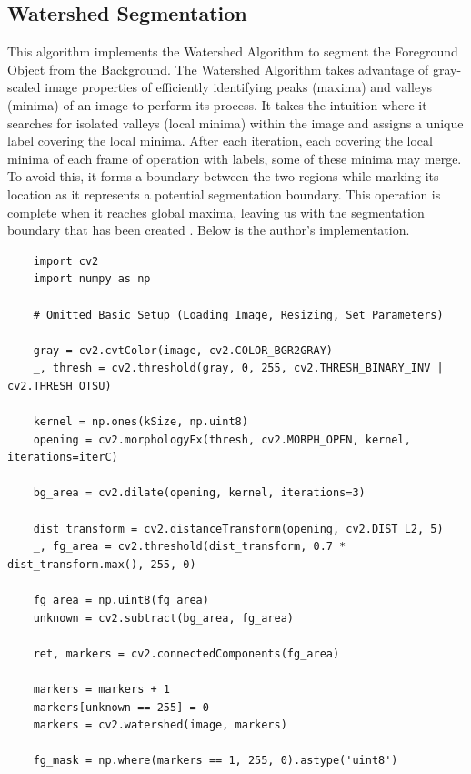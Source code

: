\documentclass{article}
\begin{document}
\subsection{Watershed Segmentation}

This algorithm implements the Watershed Algorithm to segment the Foreground Object from the Background. The Watershed Algorithm takes advantage of gray-scaled image properties of efficiently identifying peaks (maxima) and valleys (minima) of an image to perform its process. It takes the intuition where it searches for isolated valleys (local minima) within the image and assigns a unique label covering the local minima. After each iteration, each covering the local minima of each frame of operation with labels, some of these minima may merge. To avoid this, it forms a boundary between the two regions while marking its location as it represents a potential segmentation boundary. This operation is complete when it reaches global maxima, leaving us with the segmentation boundary that has been created \cite{Watershed2000}. Below is the author's implementation.

\begin{verbatim}
    import cv2
    import numpy as np

    # Omitted Basic Setup (Loading Image, Resizing, Set Parameters)

    gray = cv2.cvtColor(image, cv2.COLOR_BGR2GRAY)
    _, thresh = cv2.threshold(gray, 0, 255, cv2.THRESH_BINARY_INV | cv2.THRESH_OTSU)

    kernel = np.ones(kSize, np.uint8)
    opening = cv2.morphologyEx(thresh, cv2.MORPH_OPEN, kernel, iterations=iterC)

    bg_area = cv2.dilate(opening, kernel, iterations=3)

    dist_transform = cv2.distanceTransform(opening, cv2.DIST_L2, 5)
    _, fg_area = cv2.threshold(dist_transform, 0.7 * dist_transform.max(), 255, 0)

    fg_area = np.uint8(fg_area)
    unknown = cv2.subtract(bg_area, fg_area)

    ret, markers = cv2.connectedComponents(fg_area)

    markers = markers + 1
    markers[unknown == 255] = 0
    markers = cv2.watershed(image, markers)

    fg_mask = np.where(markers == 1, 255, 0).astype('uint8')
\end{verbatim}
\end{document}

